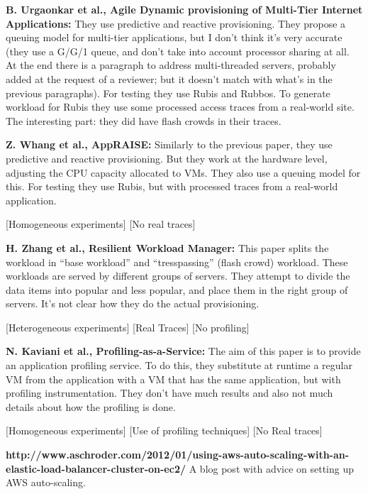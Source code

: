 
{\bf B. Urgaonkar et al., Agile Dynamic provisioning of Multi-Tier Internet Applications:}
They use predictive and reactive provisioning. They propose a queuing model
for multi-tier applications, but I don't think it's very accurate (they use
a G/G/1 queue, and don't take into account processor sharing at all. At
the end there is a paragraph to address multi-threaded servers, probably
added at the request of a reviewer; but it doesn't match with what's 
in the previous paragraphs). For testing they use Rubis and Rubbos. To generate
workload for Rubis they use some processed access traces from a real-world site.
The interesting part: they did have flash crowds in their traces. 

{\bf Z. Whang et al., AppRAISE:}
Similarly to the previous paper, they use predictive and reactive provisioning.
But they work at the hardware level, adjusting the CPU capacity allocated to
VMs. They also use a queuing model for this. For testing they use Rubis,
but with processed traces from a real-world application.

[Homogeneous experiments] [No real traces]

{\bf H. Zhang et al., Resilient Workload Manager:} 
This paper splits the workload in ``base workload'' and ``tresspassing'' (flash crowd)
workload. These workloads are served by different groups of servers. They attempt to 
divide the data items into popular and less popular, and place them in the right
group of servers. It's not clear how they do the actual provisioning.

[Heterogeneous experiments] [Real Traces] [No profiling]

{\bf N. Kaviani et al., Profiling-as-a-Service:}
The aim of this paper is to provide an application profiling service. To do
this, they substitute at runtime a regular VM from the application with
a VM that has the same application, but with profiling instrumentation.
They don't have much results and also not much details about how the
profiling is done.

[Homogeneous experiments] [Use of profiling techniques] [No Real traces]

{\bf http://www.aschroder.com/2012/01/using-aws-auto-scaling-with-an-elastic-load-balancer-cluster-on-ec2/ }
A blog post with advice on setting up AWS auto-scaling.
